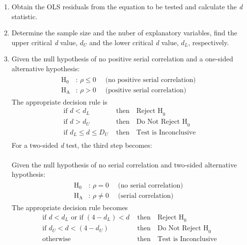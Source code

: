 \documentclass[11pt]{article}
\begin{document}
\begin{enumerate}
\item Obtain the OLS residuals from the equation to be tested and calculate the \textit{d} statistic.
\item Determine the sample size and the nuber of explanatory variables, find the upper critical \textit{d} value, $d_U$ and the lower critical \textit{d} value, $d_L$, respectively. 
\item Given the null hypothesis of no positive serial correlation and a one-sided alternative hypothesis:
\begin{align}
\label{eg9_12}
\begin{split}
\text{H}_0 & \text{: }\rho \leq 0 \quad\text{ (no positive serial correlation) }\\ 
\text{H}_\text{A} & \text{: } \rho > 0 \quad\text{ (positive serial correlation) }
\end{split}
\end{align}
The appropriate decision rule is
\begin{align*}
\text{if } d<d_L &\text{ then} \quad \text{Reject H}_0\\
\text{if } d>d_U &\text{ then} \quad \text{Do Not Reject H}_0\\
\text{if } d_L\leq d \leq D_U &\text{ then} \quad \text{Test is Inconclusive}\\
\end{align*}
For a two-sided \textit{d} test, the third step becomes:\\ \\
Given the null hypothesis of no serial correlation and two-sided alternative hypothesis:
\begin{align}
\label{eg9_13}
\begin{split}
\text{H}_0 & \text{: }\rho = 0 \quad\text{ (no serial correlation) }\\ 
\text{H}_\text{A} & \text{: } \rho \neq 0 \quad\text{ (serial correlation) }
\end{split}
\end{align}
The appropriate decision rule becomes
\begin{align*}
\text{if } d<d_L \text{ or if } (4-d_L) < d&\text{ then} \quad \text{Reject H}_0\\
\text{if } d_U<d<(4-d_U) &\text{ then} \quad \text{Do Not Reject H}_0\\
\text{otherwise } &\text{ then} \quad \text{Test is Inconclusive}\\
\end{align*}
\end{enumerate}
\end{document}
